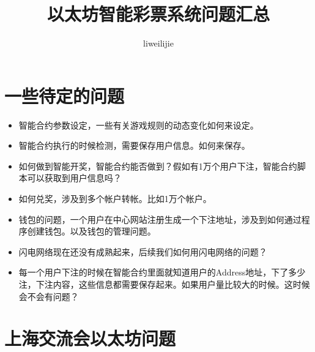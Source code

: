 \documentclass[11pt]{article}
\author{liweilijie}
\date{}
\title{以太坊智能彩票系统问题汇总}
\begin{document}
\maketitle
\tableofcontents


\section{一些待定的问题}
\label{sec:orgheadline1}
\begin{itemize}
\item 智能合约参数设定，一些有关游戏规则的动态变化如何来设定。
\item 智能合约执行的时候检测，需要保存用户信息。如何来保存。
\item 如何做到智能开奖，智能合约能否做到？假如有1万个用户下注，智能合约脚本可以获取到用户信息吗？
\item 如何兑奖，涉及到多个帐户转帐。比如1万个帐户。
\item 钱包的问题，一个用户在中心网站注册生成一个下注地址，涉及到如何通过程序创建钱包。以及钱包的管理问题。
\item 闪电网络现在还没有成熟起来，后续我们如何用闪电网络的问题？
\item 每一个用户下注的时候在智能合约里面就知道用户的Address地址，下了多少注，下注内容，这些信息都需要保存起来。如果用户量比较大的时候。这时候会不会有问题？
\end{itemize}


\section{上海交流会以太坊问题}
\label{sec:orgheadline2}
\end{document}
